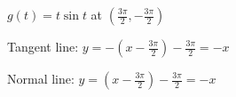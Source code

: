 {$g(t) = t\sin t$ at $(\frac{3\pi}{2},-\frac{3\pi}{2})$
}
{Tangent line: $y = -(x-\frac{3\pi}{2}) - \frac{3\pi}{2} = -x$

Normal line: $y = (x-\frac{3\pi}{2}) - \frac{3\pi}{2} = -x$
}
